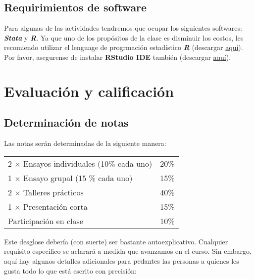 \documentclass[12]{article}
\begin{document}
\subsection*{Requirimientos de software}
Para algunas de las actividades tendremos que ocupar los siguientes softwares: \textit{\textbf{Stata}} y \textit{\textbf{R}}. Ya que uno de los propósitos de la clase es disminuir los costos, les recomiendo utilizar el lenguage de progrmación estadístico \textbf{\textit{R}} (descargar \href{https://www.r-project.org/}{aquí}). Por favor, asegurense de instalar \textbf{RStudio IDE} también (descargar \href{https://www.rstudio.com/products/rstudio/download/preview/}{aquí}).

\vspace{-0.25cm}
\section*{Evaluación y calificación}

\subsection*{Determinación de notas}


Las notas serán determinadas de la siguiente manera: 

\begin{table}[!h] \centering 
	\label{tab:grades} 
	\begin{tabularx}{0.5\textwidth}{Xr} 
		\toprule
		2 $ \times$ Ensayos individuales (10\% cada uno)	& 20\% \\
		1 $ \times$ Ensayo grupal (15 \% cada uno)			& 15\% \\
		2 $ \times$ Talleres prácticos					& 40\% \\
		1 $ \times$ Presentación corta					& 15\% \\
		Participación en clase							& 10\% \\
		\bottomrule
	\end{tabularx} 
\end{table} 

Este desglose debería (con suerte) ser bastante autoexplicativo. Cualquier requisito específico se aclarará a medida que avanzamos en el curso. Sin embargo, aquí hay algunos detalles adicionales para \sout{pedantes} las personas a quienes les gusta todo lo que está escrito con precisión:

\vspace{-0.25cm}
\end{document}
